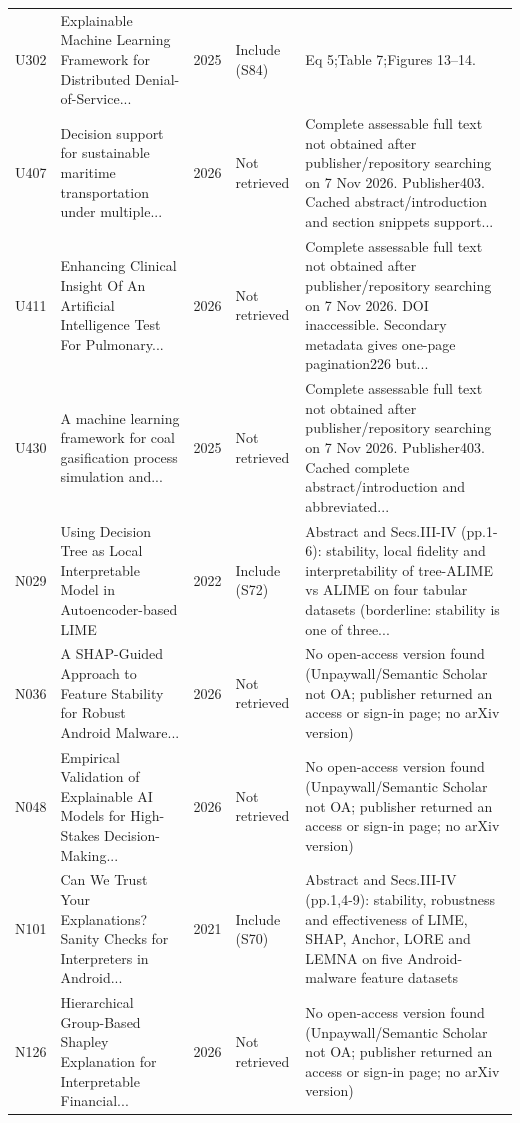 \begin{longtable}{@{}P{1.0cm}P{6.3cm}P{0.7cm}P{1.6cm}P{6.1cm}@{}}
U302 & Explainable Machine Learning Framework for Distributed Denial-of-Service... & 2025 & Include (S84) & Eq 5;Table 7;Figures 13--14. \\
U407 & Decision support for sustainable maritime transportation under multiple... & 2026 & Not retrieved & Complete assessable full text not obtained after publisher/\allowbreak{}repository searching on 7 Nov 2026. Publisher403. Cached abstract/\allowbreak{}introduction and section snippets support... \\
U411 & Enhancing Clinical Insight Of An Artificial Intelligence Test For Pulmonary... & 2026 & Not retrieved & Complete assessable full text not obtained after publisher/\allowbreak{}repository searching on 7 Nov 2026. DOI inaccessible. Secondary metadata gives one-page pagination226 but... \\
U430 & A machine learning framework for coal gasification process simulation and... & 2025 & Not retrieved & Complete assessable full text not obtained after publisher/\allowbreak{}repository searching on 7 Nov 2026. Publisher403. Cached complete abstract/\allowbreak{}introduction and abbreviated... \\
N029 & Using Decision Tree as Local Interpretable Model in Autoencoder-based LIME & 2022 & Include (S72) & Abstract and Secs.III-IV (pp.1-6): stability, local fidelity and interpretability of tree-ALIME vs ALIME on four tabular datasets (borderline: stability is one of three... \\
N036 & A SHAP-Guided Approach to Feature Stability for Robust Android Malware... & 2026 & Not retrieved & No open-access version found (Unpaywall/\allowbreak{}Semantic Scholar not OA; publisher returned an access or sign-in page; no arXiv version) \\
N048 & Empirical Validation of Explainable AI Models for High-Stakes Decision-Making... & 2026 & Not retrieved & No open-access version found (Unpaywall/\allowbreak{}Semantic Scholar not OA; publisher returned an access or sign-in page; no arXiv version) \\
N101 & Can We Trust Your Explanations? Sanity Checks for Interpreters in Android... & 2021 & Include (S70) & Abstract and Secs.III-IV (pp.1,4-9): stability, robustness and effectiveness of LIME, SHAP, Anchor, LORE and LEMNA on five Android-malware feature datasets \\
N126 & Hierarchical Group-Based Shapley Explanation for Interpretable Financial... & 2026 & Not retrieved & No open-access version found (Unpaywall/\allowbreak{}Semantic Scholar not OA; publisher returned an access or sign-in page; no arXiv version) \\

\end{longtable}
